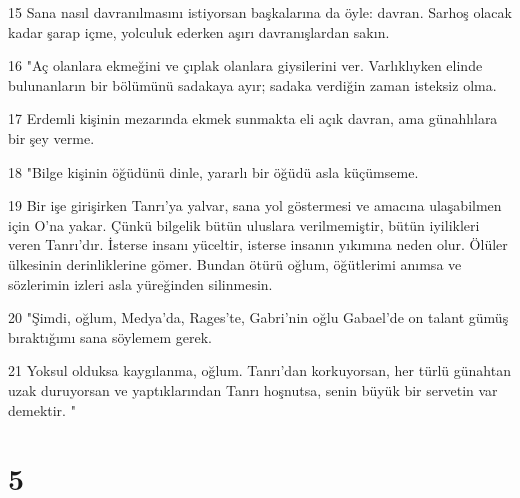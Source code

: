 \par 15 Sana nasıl davranılmasını istiyorsan başkalarına da öyle: davran. Sarhoş olacak kadar şarap içme, yolculuk ederken aşırı davranışlardan sakın.
\par 16 "Aç olanlara ekmeğini ve çıplak olanlara giysilerini ver. Varlıklıyken elinde bulunanların bir bölümünü sadakaya ayır; sadaka verdiğin zaman isteksiz olma.
\par 17 Erdemli kişinin mezarında ekmek sunmakta eli açık davran, ama günahlılara bir şey verme.
\par 18 "Bilge kişinin öğüdünü dinle, yararlı bir öğüdü asla küçümseme.
\par 19 Bir işe girişirken Tanrı'ya yalvar, sana yol göstermesi ve amacına ulaşabilmen için O'na yakar. Çünkü bilgelik bütün uluslara verilmemiştir, bütün iyilikleri veren Tanrı'dır. İsterse insanı yüceltir, isterse insanın yıkımına neden olur. Ölüler ülkesinin derinliklerine gömer. Bundan ötürü oğlum, öğütlerimi anımsa ve sözlerimin izleri asla yüreğinden silinmesin.
\par 20 "Şimdi, oğlum, Medya'da, Rages'te, Gabri'nin oğlu Gabael'de on talant gümüş bıraktığımı sana söylemem gerek.
\par 21 Yoksul olduksa kaygılanma, oğlum. Tanrı'dan korkuyorsan, her türlü günahtan uzak duruyorsan ve yaptıklarından Tanrı hoşnutsa, senin büyük bir servetin var demektir. "

\chapter{5}

